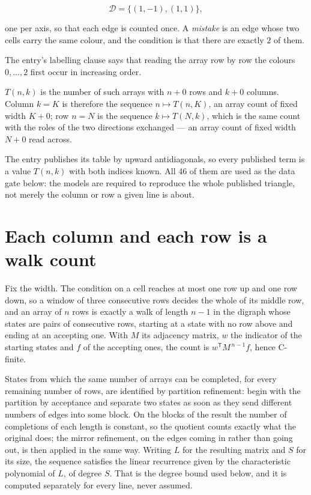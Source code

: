 \documentclass[11pt]{article}
\theoremstyle{definition}
\begin{document}
\[\mathcal{D} = \{(1,-1), (1,1)\},\]

one per axis, so that each edge is counted once. A {\itshape mistake} is an edge whose two cells carry the same colour, and the condition is that there are exactly $2$ of them.

The entry's labelling clause says that reading the array row by row the colours $0,\dots,2$ first occur in increasing order.

$T(n,k)$ is the number of such arrays with $n + 0$ rows and $k + 0$ columns. Column $k = K$ is therefore the sequence $n \mapsto T(n,K)$, an array count of fixed width $K + 0$; row $n = N$ is the sequence $k \mapsto T(N,k)$, which is the same count with the roles of the two directions exchanged --- an array count of fixed width $N + 0$ read across.

The entry publishes its table by upward antidiagonals, so every published term is a value $T(n,k)$ with both indices known. All 46 of them are used as the data gate below: the models are required to reproduce the whole published triangle, not merely the column or row a given line is about.

\section{Each column and each row is a walk count}

Fix the width. The condition on a cell reaches at most one row up and one row down, so a window of three consecutive rows decides the whole of its middle row, and an array of $n$ rows is exactly a walk of length $n-1$ in the digraph whose states are pairs of consecutive rows, starting at a state with no row above and ending at an accepting one. With $M$ its adjacency matrix, $w$ the indicator of the starting states and $f$ of the accepting ones, the count is $w^{\mathsf T}M^{\,n-1}f$, hence C-finite.

States from which the same number of arrays can be completed, for every remaining number of rows, are identified by partition refinement: begin with the partition by acceptance and separate two states as soon as they send different numbers of edges into some block. On the blocks of the result the number of completions of each length is constant, so the quotient counts exactly what the original does; the mirror refinement, on the edges coming in rather than going out, is then applied in the same way. Writing $L$ for the resulting matrix and $S$ for its size, the sequence satisfies the linear recurrence given by the characteristic polynomial of $L$, of degree $S$. That is the degree bound used below, and it is computed separately for every line, never assumed.
\end{document}
